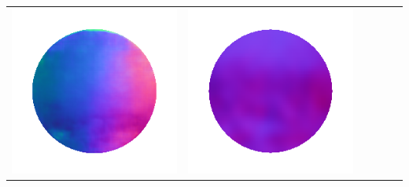 \begin{tabularx}{\linewidth}{@{}Y@{}Y@{}Y@{}Y@{}Y@{}Y@{}}
\includegraphics[width=\linewidth]{semisynthetic/20150514_13_marrnet_out.png} &
\includegraphics[width=\linewidth]{semisynthetic/20150514_13_ef_out.png} \\

\end{tabularx}
